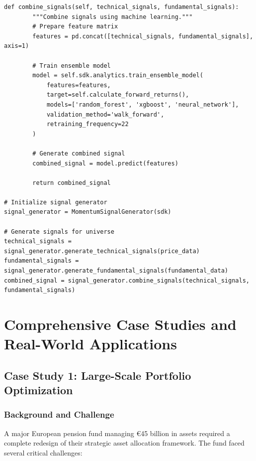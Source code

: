 \documentclass[12pt,a4paper]{article}
\theoremstyle{definition}
\theoremstyle{remark}
\begin{document}
\begin{lstlisting}[caption=Multi-Factor Signal Generation]
    def combine_signals(self, technical_signals, fundamental_signals):
        """Combine signals using machine learning."""
        # Prepare feature matrix
        features = pd.concat([technical_signals, fundamental_signals], axis=1)
        
        # Train ensemble model
        model = self.sdk.analytics.train_ensemble_model(
            features=features,
            target=self.calculate_forward_returns(),
            models=['random_forest', 'xgboost', 'neural_network'],
            validation_method='walk_forward',
            retraining_frequency=22
        )
        
        # Generate combined signal
        combined_signal = model.predict(features)
        
        return combined_signal

# Initialize signal generator
signal_generator = MomentumSignalGenerator(sdk)

# Generate signals for universe
technical_signals = signal_generator.generate_technical_signals(price_data)
fundamental_signals = signal_generator.generate_fundamental_signals(fundamental_data)
combined_signal = signal_generator.combine_signals(technical_signals, fundamental_signals)
\end{lstlisting}

\section{Comprehensive Case Studies and Real-World Applications}

\subsection{Case Study 1: Large-Scale Portfolio Optimization}

\subsubsection{Background and Challenge}

A major European pension fund managing €45 billion in assets required a complete redesign of their strategic asset allocation framework. The fund faced several critical challenges:
\end{document}
